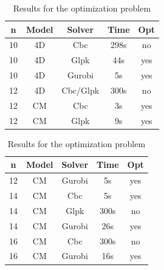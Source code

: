 \begin{table}[H]
    \centering
    \begin{tabular}{|c|c|c|c|c|}
    \hline
        \textbf{n} &  \textbf{Model} & \textbf{Solver} & \textbf{Time} & \textbf{Opt} \\
    \hline
         10 & 4D & Cbc & 298s & no \\
         10 & 4D & Glpk & 44s & yes \\
         10 & 4D & Gurobi & 5s & yes \\
         12 & 4D & Cbc/Glpk & 300s & no \\
         12 & CM & Cbc & 3s & yes \\
         12 & CM & Glpk & 9s & yes \\
    \hline
    \end{tabular}
    \begin{tabular}{|c|c|c|c|c|}
    \hline
        \textbf{n} &  \textbf{Model} & \textbf{Solver} & \textbf{Time} & \textbf{Opt} \\
    \hline
         12 & CM & Gurobi & 5s & yes \\
         14 & CM & Cbc & 5s & yes \\
         14 & CM & Glpk & 300s & no \\
         14 & CM & Gurobi & 26s & yes \\
         16 & CM & Cbc & 300s & no \\
         16 & CM & Gurobi & 16s & yes \\
    \hline
    \end{tabular}
    \caption{Results for the optimization problem}
    \label{tab:mip1}
\end{table}